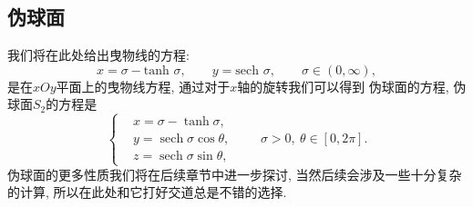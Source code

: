 \documentclass[./main.tex]{subfiles}
\begin{document}
\subsection{伪球面}
我们将在此处给出曳物线的方程: 
\[
    x=\sigma-\text{tanh }\sigma,\qquad
    y=\text{sech }\sigma,\qquad \sigma\in(0,\infty),
\]
是在$xOy$平面上的曳物线方程, 通过对于$x$轴的旋转我们可以得到
伪球面的方程, 伪球面$S_2$的方程是
\[
\left\{\begin{aligned}
&x=\sigma-\tanh\sigma,\\
&y=\operatorname{sech}\sigma\cos\theta,\\
&z=\operatorname{sech}\sigma\sin\theta,
\end{aligned}\right.\qquad \sigma>0,\ \theta\in[0,2\pi].
\]
伪球面的更多性质我们将在后续章节中进一步探讨, 当然后续会涉及一些十分复杂的计算, 
所以在此处和它打好交道总是不错的选择. 
\end{document}
